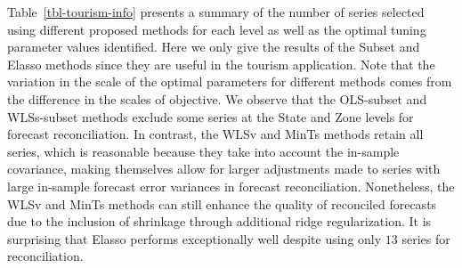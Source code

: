 \documentclass[11pt,a4paper,]{article}
\begin{document}
Table~\ref{tbl-tourism-info} presents a summary of the number of series
selected using different proposed methods for each level as well as the
optimal tuning parameter values identified. Here we only give the
results of the Subset and Elasso methods since they are useful in the
tourism application. Note that the variation in the scale of the optimal
parameters for different methods comes from the difference in the scales
of objective. We observe that the OLS-subset and WLSs-subset methods
exclude some series at the State and Zone levels for forecast
reconciliation. In contrast, the WLSv and MinTs methods retain all
series, which is reasonable because they take into account the in-sample
covariance, making themselves allow for larger adjustments made to
series with large in-sample forecast error variances in forecast
reconciliation. Nonetheless, the WLSv and MinTs methods can still
enhance the quality of reconciled forecasts due to the inclusion of
shrinkage through additional ridge regularization. It is surprising that
Elasso performs exceptionally well despite using only \(13\) series for
reconciliation.

\hypertarget{tbl-tourism-info}{}
\begin{table}[!h]
\caption{\label{tbl-tourism-info}Number of time series selected using different proposed methods and the
optimal parameter values identified in the tourism application. }\tabularnewline

\centering
{}
\end{table}
\end{document}
